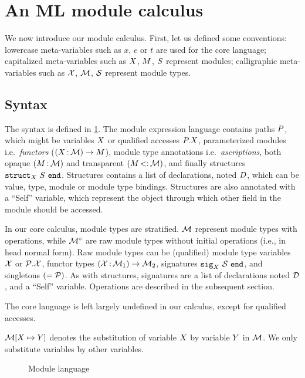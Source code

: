 \section{An ML module calculus}

We now introduce our module calculus.
First, let us defined some conventions:
lowercase meta-variables such as $x$, $e$ or $t$ are used for the core language;
capitalized meta-variables such as $X$, $M$, $S$ represent modules;
calligraphic meta-variables such as $\mathcal X$, $\mathcal M$, $\mathcal S$ represent module types.

\subsection{Syntax}

The syntax is defined in \cref{grammar}.
The module expression language contains paths $P$, which might
be variables $X$ or qualified accesses $P.X$,
parameterized modules i.e.~\emph{functors} ($(X \operatorname{:} \mathcal M) \to M$),
module type annotations i.e.~\emph{ascriptions}, both
opaque $(M \operatorname{:} \mathcal M)$ and transparent $(M \operatorname{<:} \mathcal M)$,
and finally structures $\mathtt{struct}_{X}\ S\ \mathtt{end}$. Structures
contains a list of declarations, noted $D$, which can be value, type, module or module type bindings. Structures are also annotated with a ``Self'' variable,
which represent the object through which
other field in the module should be accessed.

In our core calculus, module types are stratified. $\mathcal M$ represent module
types with operations, while ${\mathcal M^\circ}$ are raw module types without initial operations
(i.e., in head normal form). Raw module types can be (qualified)
module type variables $\mathcal X$ or $\mathcal P.\mathcal X$, functor types
$(\mathcal X \operatorname{:} \mathcal M_1) \to \mathcal M_2$, signatures $\mathtt{sig}_{X}\ \mathcal S\ \mathtt{end}$,
and singletons $(= \mathcal P)$.
As with structures, signatures are a list of declarations noted $\mathcal D$, and
a ``Self'' variable. Operations are described in the subsequent section.

The core language is left largely undefined in our calculus, except for qualified
accesses.

$\mathcal M\!\left[X \mapsto Y\right]$ denotes the substitution of variable $X$ by variable $Y$ in $\mathcal M$. We only substitute variables by other variables.

\begin{figure}[!hb]
  
  \caption{Module language}
  \label{grammar}
\end{figure}



